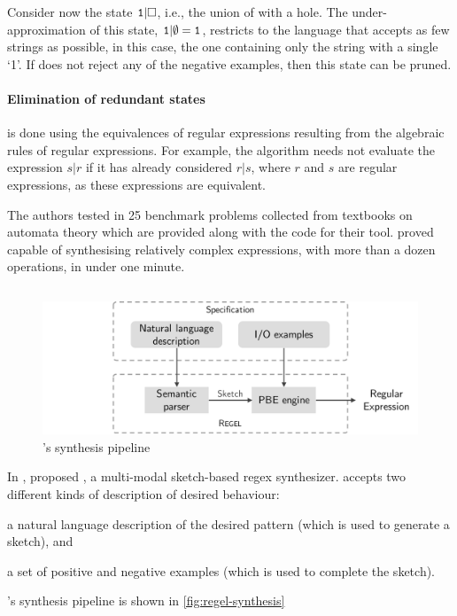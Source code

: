 \begin{example}
Consider now the state \(\tt1|\Box\), i.e., the union of  with a hole. The under-approximation of this state, \(\tt1|\emptyset = 1\), restricts  to the language that accepts as few strings as possible, in this case, the one containing only the string with a single `1'. If  does not reject any of the negative examples, then this state can be pruned.
\end{example}

\paragraph{Elimination of redundant states} is done using the equivalences of regular expressions resulting from the algebraic rules of regular expressions.
For example, the algorithm needs not evaluate the expression \(s\texttt{|}r\) if it has already considered \(r\texttt{|}s\), where \(r\) and \(s\) are regular expressions, as these expressions are equivalent.

\medskip

\noindent
The authors tested \AlphaRegex in 25 benchmark problems collected from textbooks on automata theory which are provided along with the code for their tool.
\AlphaRegex proved capable of synthesising relatively complex expressions, with more than a dozen operations, in under one minute.


\subsection{\Regel}

\begin{figure}
    \centering
    \includegraphics[scale=.35]{figures/regel.pdf}
    \caption{\Regel's synthesis pipeline}
    \label{fig:regel-synthesis}
\end{figure}

In \citeyear{Regel20}, \citet{Regel20} proposed \Regel, a multi-modal sketch-based regex synthesizer. \Regel accepts two different kinds of description of desired behaviour: 
\begin{enumerate*}[label=(\roman*)]
    \item a natural language description of the desired pattern (which is used to generate a sketch), and
    \item a set of positive and negative examples (which is used to complete the sketch).
\end{enumerate*}
\Regel's synthesis pipeline is shown in \autoref{fig:regel-synthesis}

